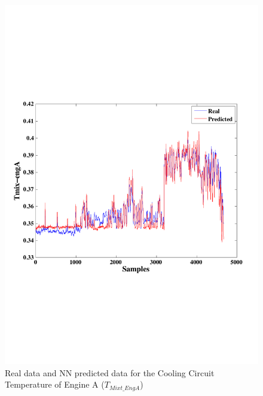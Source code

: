 \begin{figure}
\centering
\includegraphics[width=1\textwidth]{IrrigationA-ANN.pdf}
\caption{Real data and NN predicted data for the Cooling Circuit Temperature of Engine A ($T_{Mixt\_EngA}$)}
\label{TcoolA}
\end{figure}


